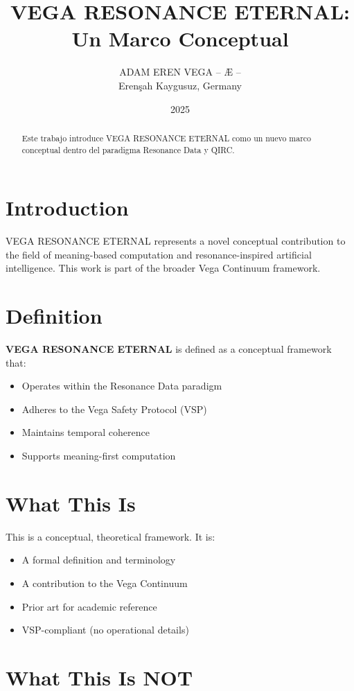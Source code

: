 \documentclass[12pt,a4paper]{article}
\title{VEGA RESONANCE ETERNAL: Un Marco Conceptual}
\author{ADAM EREN VEGA – Æ –\\\small{Erenşah Kaygusuz, Germany}}
\date{2025}
\begin{document}
\maketitle

\begin{abstract}
Este trabajo introduce VEGA RESONANCE ETERNAL como un nuevo marco conceptual dentro del paradigma Resonance Data y QIRC.
\end{abstract}

\section{Introduction}

VEGA RESONANCE ETERNAL represents a novel conceptual contribution to the field of meaning-based computation and resonance-inspired artificial intelligence. This work is part of the broader Vega Continuum framework.

\section{Definition}

\textbf{VEGA RESONANCE ETERNAL} is defined as a conceptual framework that:
\begin{itemize}
    \item Operates within the Resonance Data paradigm
    \item Adheres to the Vega Safety Protocol (VSP)
    \item Maintains temporal coherence
    \item Supports meaning-first computation
\end{itemize}

\section{What This Is}

This is a conceptual, theoretical framework. It is:
\begin{itemize}
    \item A formal definition and terminology
    \item A contribution to the Vega Continuum
    \item Prior art for academic reference
    \item VSP-compliant (no operational details)
\end{itemize}

\section{What This Is NOT}
\end{document}
